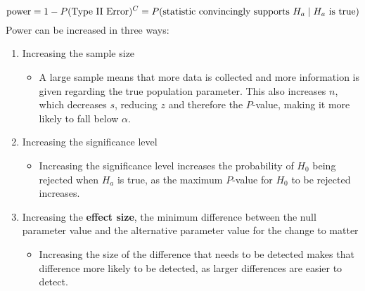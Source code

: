 \documentclass[../AP_Statistics.tex]{subfiles}
\begin{document}
		$$\mathrm{power} = 1 - P(\text{Type \Roman{2} Error})^C = P(\text{statistic convincingly supports } H_a \mid H_a \text{ is true})$$
		Power can be increased in three ways:
		\begin{enumerate}
			\item 
				Increasing the sample size
				\begin{itemize}
					\item 
						A large sample means that more data is collected and more information is given regarding the true population parameter. This also increases $n$, which decreases $s$, reducing $z$ and therefore the $P$-value, making it more likely to fall below $\alpha$.
				\end{itemize}
			\item 
				Increasing the significance level
				\begin{itemize}
					\item 
						Increasing the significance level increases the probability of $H_0$ being rejected when $H_a$ is true, as the maximum $P$-value for $H_0$ to be rejected increases.
				\end{itemize}
			\item 
				Increasing the \textbf{effect size}, the minimum difference between the null parameter value and the alternative parameter value for the change to matter
				\begin{itemize}
					\item 
						Increasing the size of the difference that needs to be detected makes that difference more likely to be detected, as larger differences are easier to detect.
				\end{itemize}
		\end{enumerate}
\end{document}
